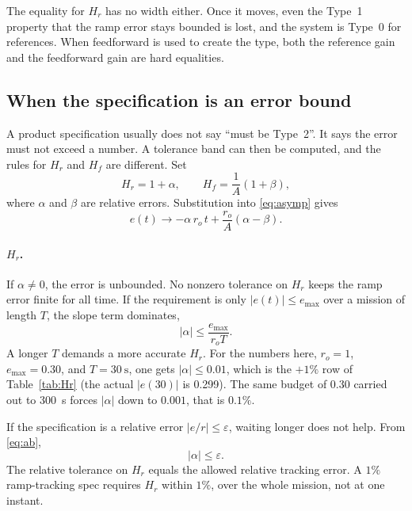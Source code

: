 \documentclass[12pt,a4paper]{article}
\begin{document}
The equality for \(H_r\) has no width either. Once it moves, even the Type~1 property that the ramp error stays bounded is lost, and the system is Type~0 for references.
When feedforward is used to create the type, both the reference gain and the feedforward gain are hard equalities.

\subsection{When the specification is an error bound}

A product specification usually does not say ``must be Type~2''. It says the error must not exceed a number.
A tolerance band can then be computed, and the rules for \(H_r\) and \(H_f\) are different.
Set
\[
  H_r=1+\alpha,\qquad H_f=\frac{1}{A}(1+\beta),
\]
where \(\alpha\) and \(\beta\) are relative errors. Substitution into \eqref{eq:asymp} gives
\begin{equation}
  e(t)\to -\alpha\, r_o\, t+\frac{r_o}{A}(\alpha-\beta).
  \label{eq:ab}
\end{equation}

\paragraph{\(H_r\).}
If \(\alpha\neq 0\), the error is unbounded.
No nonzero tolerance on \(H_r\) keeps the ramp error finite for all time.
If the requirement is only \(|e(t)|\le e_{\max}\) over a mission of length \(T\), the slope term dominates,
\begin{equation}
  |\alpha|\le\frac{e_{\max}}{r_o T}.
  \label{eq:tol-Hr-T}
\end{equation}
A longer \(T\) demands a more accurate \(H_r\). For the numbers here, \(r_o=1\), \(e_{\max}=0.30\), and \(T=30~\mathrm{s}\), one gets \(|\alpha|\le 0.01\), which is the \(+1\%\) row of Table~\ref{tab:Hr} (the actual \(|e(30)|\) is 0.299).
The same budget of 0.30 carried out to 300~s forces \(|\alpha|\) down to \(0.001\), that is \(0.1\%\).

If the specification is a relative error \(|e/r|\le\varepsilon\), waiting longer does not help. From \eqref{eq:ab},
\begin{equation}
  |\alpha|\le\varepsilon.
  \label{eq:tol-Hr-rel}
\end{equation}
The relative tolerance on \(H_r\) equals the allowed relative tracking error. A \(1\%\) ramp-tracking spec requires \(H_r\) within \(1\%\), over the whole mission, not at one instant.
\end{document}
